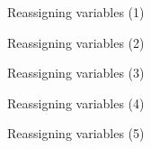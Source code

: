 \begin{frame}[fragile]{Reassigning variables (1)}
	\socrative
\end{frame}

\begin{frame}[fragile]{Reassigning variables (2)}
	\socrative
\end{frame}

\begin{frame}[fragile]{Reassigning variables (3)}
	\socrative
\end{frame}

\begin{frame}[fragile]{Reassigning variables (4)}
	\socrative
\end{frame}

\begin{frame}[fragile]{Reassigning variables (5)}
	\socrative
\end{frame}

